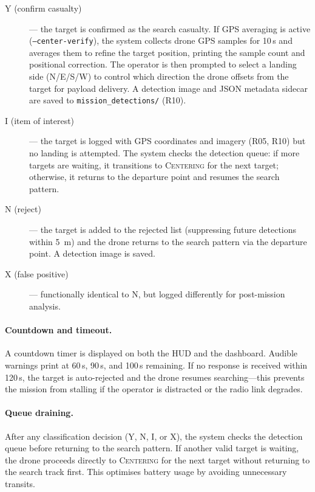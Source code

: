 \begin{description}
  \item[Y (confirm casualty)] --- the target is confirmed as the search casualty.  If GPS averaging is active (\texttt{--center-verify}), the system collects drone GPS samples for 10\,s and averages them to refine the target position, printing the sample count and positional correction.  The operator is then prompted to select a landing side (N/E/S/W) to control which direction the drone offsets from the target for payload delivery.  A detection image and JSON metadata sidecar are saved to \texttt{mission\_detections/} (R10).
  \item[I (item of interest)] --- the target is logged with GPS coordinates and imagery (R05, R10) but no landing is attempted.  The system checks the detection queue: if more targets are waiting, it transitions to \textsc{Centering} for the next target; otherwise, it returns to the departure point and resumes the search pattern.
  \item[N (reject)] --- the target is added to the rejected list (suppressing future detections within \SI{5}{\metre}) and the drone returns to the search pattern via the departure point.  A detection image is saved.
  \item[X (false positive)] --- functionally identical to N, but logged differently for post-mission analysis.
\end{description}

\paragraph{Countdown and timeout.}  A countdown timer is displayed on both the HUD and the dashboard.  Audible warnings print at 60\,s, 90\,s, and 100\,s remaining.  If no response is received within 120\,s, the target is auto-rejected and the drone resumes searching---this prevents the mission from stalling if the operator is distracted or the radio link degrades.

\paragraph{Queue draining.}  After any classification decision (Y, N, I, or X), the system checks the detection queue before returning to the search pattern.  If another valid target is waiting, the drone proceeds directly to \textsc{Centering} for the next target without returning to the search track first.  This optimises battery usage by avoiding unnecessary transits.

